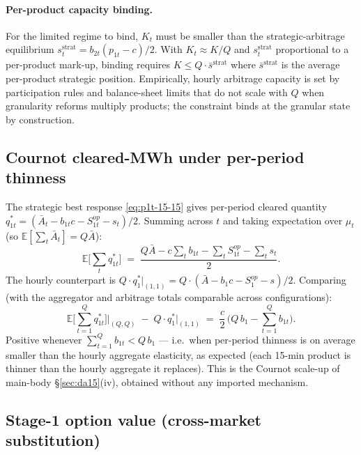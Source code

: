 \documentclass[11pt]{article}
\begin{document}
\paragraph{Per-product capacity binding.} For the limited regime to bind, $K_t$ must be smaller than the strategic-arbitrage equilibrium $s_t^{\text{strat}} = b_{2t}(p_{1t}-c)/2$. With $K_t \approx K/Q$ and $s_t^{\text{strat}}$ proportional to a per-product mark-up, binding requires $K \le Q\cdot \bar s^{\text{strat}}$ where $\bar s^{\text{strat}}$ is the average per-product strategic position. Empirically, hourly arbitrage capacity is set by participation rules and balance-sheet limits that do not scale with $Q$ when granularity reforms multiply products; the constraint binds at the granular state by construction.

\subsection{Cournot cleared-MWh under per-period thinness}\label{app:15-15:scaleup}

The strategic best response \eqref{eq:p1t-15-15} gives per-period cleared quantity $q_{1t}^* = (\bar A_t - b_{1t} c - S^{op}_{1t} - s_t)/2$. Summing across $t$ and taking expectation over $\mu_t$ (so $\mathbb{E}[\sum_t \bar A_t] = Q\bar A$):
\[
\mathbb{E}\!\bigg[\sum_t q_{1t}^*\bigg] \;=\; \frac{Q \bar A - c \sum_t b_{1t} - \sum_t S^{op}_{1t} - \sum_t s_t}{2}.
\]
The hourly counterpart is $Q\cdot q_1^*|_{(1,1)} = Q\cdot(\bar A - b_1 c - S^{op}_1 - s)/2$. Comparing (with the aggregator and arbitrage totals comparable across configurations):
\begin{equation}
\mathbb{E}\!\bigg[\sum_{t=1}^{Q} q_{1t}^*\bigg]\bigg|_{(Q,Q)} \;-\; Q\cdot q_1^*\big|_{(1,1)} \;=\; \frac{c}{2}\,\bigg(Q\, b_1 - \sum_{t=1}^{Q} b_{1t}\bigg).
\label{eq:scale-up}
\end{equation}
Positive whenever $\sum_{t=1}^{Q} b_{1t} < Q\,b_1$ --- i.e.\ when per-period thinness is on average smaller than the hourly aggregate elasticity, as expected (each 15-min product is thinner than the hourly aggregate it replaces). This is the Cournot scale-up of main-body \S\ref{sec:da15}(iv), obtained without any imported mechanism.

\subsection{Stage-1 option value (cross-market substitution)}\label{app:15-15:option}
\end{document}
